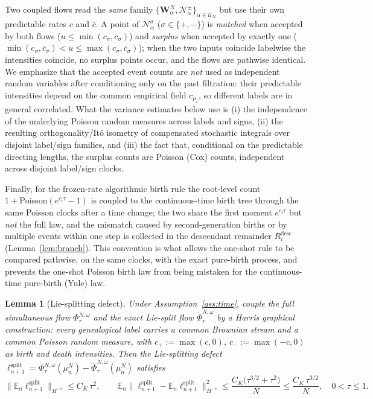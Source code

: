 \documentclass[a4paper,fleqn]{cas-sc}
\newtheorem{lemma}[theorem]{Lemma}
\theoremstyle{definition}
\theoremstyle{remark}
\begin{document}
Two coupled flows read the \emph{same} family
$\{\mathbf W^N_\alpha,\mathcal N^\pm_\alpha\}_{\alpha\in\mathcal U_N}$ but use their
own predictable rates $c$ and $\bar c$. A point of $\mathcal N^{\sigma}_\alpha$
($\sigma\in\{+,-\}$) is \emph{matched} when accepted by both flows
($u\le\min(c_\sigma,\bar c_\sigma)$) and \emph{surplus} when accepted by exactly one
($\min(c_\sigma,\bar c_\sigma)<u\le\max(c_\sigma,\bar c_\sigma)$); when the two
inputs coincide labelwise the intensities coincide, no surplus points occur, and the
flows are pathwise identical. We emphasize that the accepted event counts are
\emph{not} used as independent random variables after conditioning only on the past
filtration: their predictable intensities depend on the common empirical field
$c_{\mu_t}$, so different labels are in general correlated. What the variance
estimates below use is (i) the independence of the underlying Poisson random
measures across labels and signs, (ii) the resulting orthogonality/It\^o isometry of
compensated stochastic integrals over disjoint label/sign families, and (iii) the
fact that, conditional on the predictable directing lengths, the surplus counts are
Poisson (Cox) counts, independent across disjoint label/sign clocks.

Finally, for the frozen-rate algorithmic birth rule the root-level count
$1+\mathrm{Poisson}(e^{c_i\tau}-1)$ is coupled to the continuous-time birth tree
through the same Poisson clocks after a time change; the two share the first moment
$e^{c_i\tau}$ but \emph{not} the full law, and the mismatch caused by
second-generation births or by multiple events within one step is collected in the
descendant remainder $R^{\mathrm{desc}}_i$ (Lemma~\ref{lem:branch}). This convention
is what allows the one-shot rule to be compared pathwise, on the same clocks, with
the exact pure-birth process, and prevents the one-shot Poisson birth law from being
mistaken for the continuous-time pure-birth (Yule) law.

\begin{lemma}[Lie-splitting defect]\label{lem:split}
Under Assumption~\ref{ass:time}, couple the full simultaneous flow
$\Phi^{N,\omega}_\tau$ and the exact Lie-split flow
$\widetilde\Phi^{N,\omega}_\tau$ by a Harris graphical construction: every
genealogical label carries a common Brownian stream and a common Poisson random
measure, with $c_+:=\max(c,0)$, $c_-:=\max(-c,0)$ as birth and death intensities.
Then the Lie-splitting defect $\ell^{\mathrm{split}}_{n+1}
=\Phi^{N,\omega}_\tau(\mu^N_n)-\widetilde\Phi^{N,\omega}_\tau(\mu^N_n)$ satisfies
\begin{equation}\label{eq:split}
\|\mathbb E_n\ell^{\mathrm{split}}_{n+1}\|_{H^{-s}}\le C_K\,\tau^2,
\qquad
\mathbb E_n\|\ell^{\mathrm{split}}_{n+1}-\mathbb E_n\ell^{\mathrm{split}}_{n+1}\|_{H^{-s}}^2
\le \frac{C_K\bigl(\tau^{3/2}+\tau^{2}\bigr)}{N}\le \frac{C_K\,\tau^{3/2}}{N},
\quad 0<\tau\le1.
\end{equation}
\end{lemma}
\end{document}
